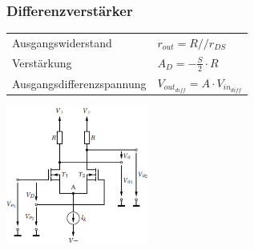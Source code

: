             \subsubsection{Differenzverstärker}
            \begin{minipage}[T]{14cm}
            	\begin{tabular}{ll}
                	Ausgangswiderstand & $r_{out} = R//r_{DS}$\\
                	Verstärkung & $A_D = -\frac{S}{2} \cdot R$\\
                Ausgangsdifferenzspannung & $V_{out_{diff}} = A \cdot V_{in_{diff}}$
				\end{tabular}
            \end{minipage}
            \begin{minipage}[T]{5cm}
                \includegraphics[height=4.5cm]{./images/MOSFET_Diffamp.png}
            \end{minipage}
